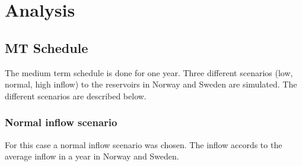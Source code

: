 \documentclass{article}
\begin{document}
\section{Analysis}

\subsection{MT Schedule}
The medium term schedule is done for one year. Three different scenarios (low, normal, high inflow) to the reservoirs in Norway and Sweden are simulated. The different scenarios are described below.

\subsubsection{Normal inflow scenario}
For this case a normal inflow scenario was chosen. The inflow accords to the average inflow in a year in Norway and Sweden.
\end{document}
